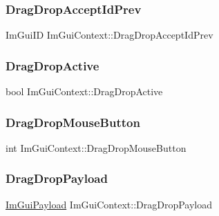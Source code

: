 \subsubsection{\texorpdfstring{Drag\+Drop\+Accept\+Id\+Prev}{DragDropAcceptIdPrev}}
{\footnotesize\ttfamily Im\+Gui\+ID Im\+Gui\+Context\+::\+Drag\+Drop\+Accept\+Id\+Prev}

\hypertarget{struct_im_gui_context_a2de4fe755e10ccfee6b06aa84b3d9c0d}{}\label{struct_im_gui_context_a2de4fe755e10ccfee6b06aa84b3d9c0d} 
\subsubsection{\texorpdfstring{Drag\+Drop\+Active}{DragDropActive}}
{\footnotesize\ttfamily bool Im\+Gui\+Context\+::\+Drag\+Drop\+Active}

\hypertarget{struct_im_gui_context_a0efbd88ee7334cb922fccb1487ba496c}{}\label{struct_im_gui_context_a0efbd88ee7334cb922fccb1487ba496c} 
\subsubsection{\texorpdfstring{Drag\+Drop\+Mouse\+Button}{DragDropMouseButton}}
{\footnotesize\ttfamily int Im\+Gui\+Context\+::\+Drag\+Drop\+Mouse\+Button}

\hypertarget{struct_im_gui_context_a35f39762769e30c083758c21fbde3e78}{}\label{struct_im_gui_context_a35f39762769e30c083758c21fbde3e78} 
\subsubsection{\texorpdfstring{Drag\+Drop\+Payload}{DragDropPayload}}
{\footnotesize\ttfamily \hyperlink{struct_im_gui_payload}{Im\+Gui\+Payload} Im\+Gui\+Context\+::\+Drag\+Drop\+Payload}

\hypertarget{struct_im_gui_context_af4797d5b38c5c659d1aa0160d46549d8}{}\label{struct_im_gui_context_af4797d5b38c5c659d1aa0160d46549d8} 
